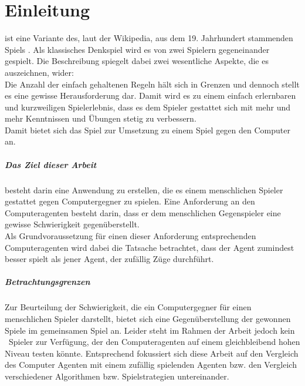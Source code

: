 \chapter{Einleitung}

\mxZitat{\ot} ist eine Variante des, laut der Wikipedia, aus dem 19. Jahrhundert stammenden Spiels  \cite{Wiki:EN:Reversi}. Als klassisches Denkspiel wird es von zwei Spielern gegeneinander gespielt. Die Beschreibung  \cite{Rose} spiegelt dabei zwei wesentliche Aspekte, die es auszeichnen, wider:
\\Die Anzahl der einfach gehaltenen Regeln hält sich in Grenzen und dennoch stellt es eine gewisse Herausforderung dar. Damit wird es zu einem einfach erlernbaren und kurzweiligen Spielerlebnis, dass es dem Spieler gestattet sich mit mehr und mehr Kenntnissen und Übungen stetig zu verbessern.
\\Damit bietet sich das Spiel zur Umsetzung zu einem Spiel gegen den Computer an.
\paragraph{Das Ziel dieser Arbeit} besteht darin eine Anwendung zu erstellen, die es einem menschlichen Spieler gestattet gegen Computergegner \mxZitat{\ot} zu spielen. Eine Anforderung an den Computeragenten besteht darin, dass er dem menschlichen Gegenspieler eine gewisse Schwierigkeit gegenüberstellt.
\\Als Grundvoraussetzung für einen dieser Anforderung entsprechenden Computeragenten wird dabei die Tatsache betrachtet, dass der Agent zumindest besser spielt als jener Agent, der zufällig Züge durchführt.
\paragraph{Betrachtungsgrenzen}
Zur Beurteilung der Schwierigkeit, die ein Computergegner für einen menschlichen Spieler darstellt, bietet sich eine Gegenüberstellung der gewonnen Spiele im gemeinsamen Spiel an. Leider steht im Rahmen der Arbeit jedoch kein \ot\ Spieler zur Verfügung, der den Computeragenten auf einem gleichbleibend hohen Niveau testen könnte. Entsprechend fokussiert sich diese Arbeit auf den Vergleich des Computer Agenten mit einem zufällig spielenden Agenten bzw. den Vergleich verschiedener Algorithmen bzw. Spielstrategien untereinander.
\newpage
